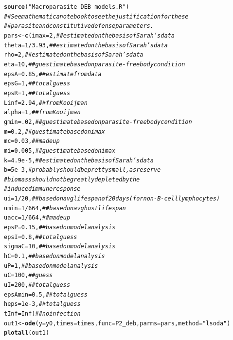 \documentclass[12pt,reqno,final,pdftex]{amsart}\usepackage[]{graphicx}\usepackage[]{color}
\makeatletter
\newcommand{\hlnum}[1]{\textcolor[rgb]{0.686,0.059,0.569}{#1}}%
\newcommand{\hlstr}[1]{\textcolor[rgb]{0.192,0.494,0.8}{#1}}%
\newcommand{\hlcom}[1]{\textcolor[rgb]{0.678,0.584,0.686}{\textit{#1}}}%
\newcommand{\hlopt}[1]{\textcolor[rgb]{0,0,0}{#1}}%
\newcommand{\hlstd}[1]{\textcolor[rgb]{0.345,0.345,0.345}{#1}}%
\newcommand{\hlkwb}[1]{\textcolor[rgb]{0.69,0.353,0.396}{#1}}%
\newcommand{\hlkwc}[1]{\textcolor[rgb]{0.333,0.667,0.333}{#1}}%
\newcommand{\hlkwd}[1]{\textcolor[rgb]{0.737,0.353,0.396}{\textbf{#1}}}%
\newenvironment{kframe}{%
 \def\at@end@of@kframe{}%
 \ifinner\ifhmode%
  \def\at@end@of@kframe{\end{minipage}}%
  \begin{minipage}{\columnwidth}%
 \fi\fi%
 \def\FrameCommand##1{\hskip\@totalleftmargin \hskip-\fboxsep
 \colorbox{shadecolor}{##1}\hskip-\fboxsep
     \hskip-\linewidth \hskip-\@totalleftmargin \hskip\columnwidth}%
 \MakeFramed {\advance\hsize-\width
   \@totalleftmargin\z@ \linewidth\hsize
   \@setminipage}}%
 {\par\unskip\endMakeFramed%
 \at@end@of@kframe}
\newenvironment{knitrout}{}{} %
\theoremstyle{plain}
\numberwithin{equation}{part}
\makeatother
\begin{document}
\begin{knitrout}
\begin{kframe}
\begin{alltt}
\hlkwd{source}\hlstd{(}\hlstr{"Macroparasite_DEB_models.R"}\hlstd{)}
\hlcom{## See mathematica notebook to see the justification for these}
\hlcom{## parasite and constitutive defense parameters.}
\hlstd{pars} \hlkwb{<-} \hlkwd{c}\hlstd{(}\hlkwc{imax}\hlstd{=}\hlnum{2}\hlstd{,} \hlcom{## estimated on the basis of Sarah's data}
          \hlkwc{theta}\hlstd{=}\hlnum{1}\hlopt{/}\hlnum{3.93}\hlstd{,} \hlcom{## estimated on the basis of Sarah's data}
          \hlkwc{rho}\hlstd{=}\hlnum{2}\hlstd{,} \hlcom{## estimated on the basis of Sarah's data}
          \hlkwc{eta}\hlstd{=}\hlnum{10}\hlstd{,} \hlcom{## guestimate based on parasite-free body condition}
          \hlkwc{epsA}\hlstd{=}\hlnum{0.85}\hlstd{,} \hlcom{## estimate from data}
          \hlkwc{epsG}\hlstd{=}\hlnum{1}\hlstd{,} \hlcom{## total guess}
          \hlkwc{epsR}\hlstd{=}\hlnum{1}\hlstd{,} \hlcom{## total guess}
          \hlkwc{Linf}\hlstd{=}\hlnum{2.94}\hlstd{,} \hlcom{## from Kooijman}
          \hlkwc{alpha}\hlstd{=}\hlnum{1}\hlstd{,} \hlcom{## from Kooijman}
          \hlkwc{gmin}\hlstd{=}\hlnum{.02}\hlstd{,} \hlcom{## guestimate based on parasite-free body condition}
          \hlkwc{m}\hlstd{=}\hlnum{0.2}\hlstd{,} \hlcom{## guestimate based on imax}
          \hlkwc{mc}\hlstd{=}\hlnum{0.03}\hlstd{,} \hlcom{## made up}
          \hlkwc{mi}\hlstd{=}\hlnum{0.005}\hlstd{,} \hlcom{## guestimate based on imax}
          \hlkwc{k}\hlstd{=}\hlnum{4.9e-5}\hlstd{,} \hlcom{## estimated on the basis of Sarah's data}
          \hlkwc{b}\hlstd{=}\hlnum{5e-3}\hlstd{,} \hlcom{# probably should be pretty small, as reserve}
                  \hlcom{# biomass should not be greatly depleted by the}
                  \hlcom{# induced immune response}
          \hlkwc{ui}\hlstd{=}\hlnum{1}\hlopt{/}\hlnum{20}\hlstd{,} \hlcom{## based on avg lifespan of 20 days (for non-B-cell lymphocytes)}
          \hlkwc{umin}\hlstd{=}\hlnum{1}\hlopt{/}\hlnum{664}\hlstd{,} \hlcom{## based on avg host lifespan}
          \hlkwc{uacc}\hlstd{=}\hlnum{1}\hlopt{/}\hlnum{664}\hlstd{,} \hlcom{## made up}
          \hlkwc{epsP}\hlstd{=}\hlnum{0.15}\hlstd{,} \hlcom{## based on model analysis}
          \hlkwc{epsI}\hlstd{=}\hlnum{0.8}\hlstd{,} \hlcom{## total guess}
          \hlkwc{sigmaC}\hlstd{=}\hlnum{10}\hlstd{,} \hlcom{## based on model analysis}
          \hlkwc{hC}\hlstd{=}\hlnum{0.1}\hlstd{,} \hlcom{## based on model analysis}
          \hlkwc{uP}\hlstd{=}\hlnum{1}\hlstd{,} \hlcom{## based on model analysis}
          \hlkwc{uC}\hlstd{=}\hlnum{100}\hlstd{,} \hlcom{## guess}
          \hlkwc{uI}\hlstd{=}\hlnum{200}\hlstd{,} \hlcom{## total guess}
          \hlkwc{epsAmin}\hlstd{=}\hlnum{0.5}\hlstd{,} \hlcom{## total guess}
          \hlkwc{heps}\hlstd{=}\hlnum{1e-3}\hlstd{,} \hlcom{## total guess}
          \hlkwc{tInf}\hlstd{=}\hlnum{Inf}\hlstd{)} \hlcom{## no infection}
\hlstd{out1} \hlkwb{<-} \hlkwd{ode}\hlstd{(}\hlkwc{y}\hlstd{=y0,} \hlkwc{times}\hlstd{=times,} \hlkwc{func}\hlstd{=P2_deb,} \hlkwc{parms}\hlstd{=pars,} \hlkwc{method}\hlstd{=}\hlstr{"lsoda"}\hlstd{)}
\hlkwd{plotall}\hlstd{(out1)}
\end{alltt}
\end{kframe}\begin{figure}


\end{figure}
\end{knitrout}
\end{document}
